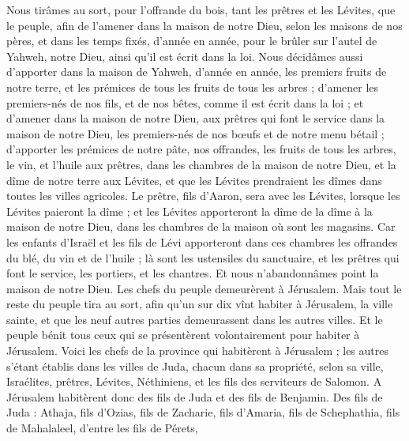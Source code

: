 \begin{multicols}{2}
Nous tirâmes au sort, pour l'offrande du bois, tant les prêtres et les Lévites, que le peuple, afin de l'amener dans la maison de notre Dieu, selon les maisons de nos pères, et dans les temps fixés, d'année en année, pour le brûler sur l'autel de Yahweh, notre Dieu, ainsi qu'il est écrit dans la loi.
Nous décidâmes aussi d'apporter dans la maison de Yahweh, d'année en année, les premiers fruits de notre terre, et les prémices de tous les fruits de tous les arbres ;
d'amener les premiers-nés de nos fils, et de nos bêtes, comme il est écrit dans la loi ; et d'amener dans la maison de notre Dieu, aux prêtres qui font le service dans la maison de notre Dieu, les premiers-nés de nos bœufs et de notre menu bétail ;
d'apporter les prémices de notre pâte, nos offrandes, les fruits de tous les arbres, le vin, et l'huile aux prêtres, dans les chambres de la maison de notre Dieu, et la dîme de notre terre aux Lévites, et que les Lévites prendraient les dîmes dans toutes les villes agricoles.
Le prêtre, fils d'Aaron, sera avec les Lévites, lorsque les Lévites paieront la dîme ; et les Lévites apporteront la dîme de la dîme à la maison de notre Dieu, dans les chambres de la maison où sont les magasins.
Car les enfants d'Israël et les fils de Lévi apporteront dans ces chambres les offrandes du blé, du vin et de l'huile ; là sont les ustensiles du sanctuaire, et les prêtres qui font le service, les portiers, et les chantres. Et nous n'abandonnâmes point la maison de notre Dieu.
\VerseOne{}Les chefs du peuple demeurèrent à Jérusalem. Mais tout le reste du peuple tira au sort, afin qu'un sur dix vînt habiter à Jérusalem, la ville sainte, et que les neuf autres parties demeurassent dans les autres villes.
Et le peuple bénit tous ceux qui se présentèrent volontairement pour habiter à Jérusalem.
Voici les chefs de la province qui habitèrent à Jérusalem ; les autres s'étant établis dans les villes de Juda, chacun dans sa propriété, selon sa ville, Israélites, prêtres, Lévites, Néthiniens, et les fils des serviteurs de Salomon.
A Jérusalem habitèrent donc des fils de Juda et des fils de Benjamin. Des fils de Juda : Athaja, fils d'Ozias, fils de Zacharie, fils d'Amaria, fils de Schephathia, fils de Mahalaleel, d'entre les fils de Pérets,

\end{multicols}
